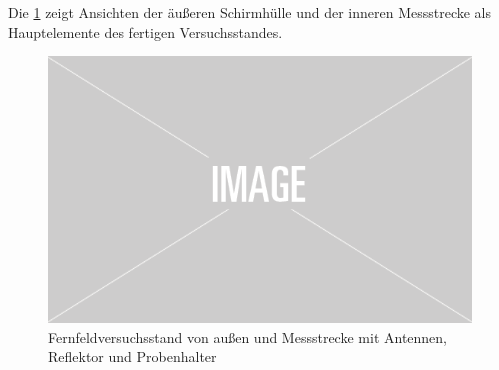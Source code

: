 Die \Abb\ref{fig:3_Gesamtversuchsstand} zeigt Ansichten der äußeren Schirmhülle und der inneren Messstrecke als Hauptelemente des fertigen Versuchsstandes.

\begin{figure}[ht]
    \centering
    \includegraphics[width=.6\textwidth]{Abbildungen/placeholder.png}
    \caption{Fernfeldversuchsstand von außen und Messstrecke mit Antennen, Reflektor und Probenhalter}
    \label{fig:3_Gesamtversuchsstand}
\end{figure}



